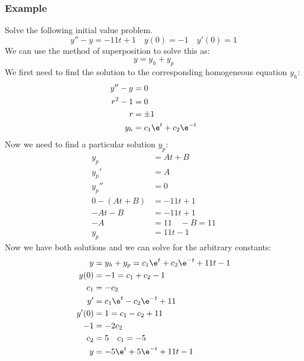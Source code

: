 \documentclass{math}
\begin{document}
\subsubsection*{Example}
Solve the following initial value problem.
\[ y''-y = -11t+1 \quad y(0) = -1 \quad y'(0) = 1 \]
We can use the method of superposition to solve this as:
\[ y = y_h+y_p \]
We first need to find the solution to the corresponding homogeneous equation
\( y_h \):
\begin{align*}
  y''-y &= 0 \\
  r^2-1 &= 0 \\
  r &= \pm1 \\
  y_h &= c_1\e^t+c_2\e^{-t}
\end{align*}
Now we need to find a particular solution \( y_p \):
\begin{align*}
  y_p &= At+B \\
  y_p' &= A \\
  y_p'' &= 0 \\
  0-(At+B) &= -11t+1 \\
  -At-B &= -11t+1 \\
  -A &= 11 \quad -B = 11 \\
  y_p &= 11t-1
\end{align*}
Now we have both solutions and we can solve for the arbitrary constants:
\begin{align*}
  y &= y_h+y_p = c_1\e^t+c_2\e^{-t}+11t-1 \\
  y(0) &= -1 = c_1+c_2-1 \\
  c_1 &= -c_2 \\
  y' &= c_1\e^t-c_2\e^{-t}+11 \\
  y'(0) &= 1 = c_1-c_2+11 \\
  -1 &= -2c_2 \\
  c_2 &= 5 \quad c_1 = -5 \\
  y &= -5\e^t+5\e^{-t}+11t-1
\end{align*}
\end{document}
